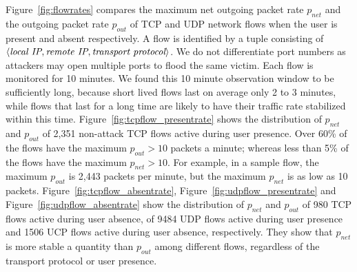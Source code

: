 Figure~\ref{fig:flowrates} compares the maximum net
outgoing packet rate $p_{net}$ and the outgoing packet rate
$p_{out}$ of TCP and UDP network flows when the user is present 
and absent respectively.  A flow is identified by a tuple consisting
of $\langle \mbox{\it local IP}, \mbox{\it remote IP}, 
\mbox{\it transport protocol} \rangle$.
We do not differentiate port numbers as attackers may open
multiple ports to flood the same victim. 
Each flow is monitored for 10 minutes. 
We found this 10 minute observation window to be sufficiently long, because short lived flows last on average only 2 to 3 minutes, 
while flows that last for a long time are likely to
have their traffic rate stabilized within this time.
Figure~\ref{fig:tcpflow_presentrate} shows the distribution of $p_{net}$
and $p_{out}$ of 2,351 non-attack TCP flows active during user presence.
Over 60\% of the flows have the maximum $p_{out}>10$ packets a
minute; whereas less than 5\% of the flows have the maximum
$p_{net}>10$. 
For example, in a sample flow, the maximum $p_{out}$ is 2,443 packets per
minute, but the maximum $p_{net}$ is as low as 10 packets.
Figure~\ref{fig:tcpflow_absentrate}, Figure~\ref{fig:udpflow_presentrate}
and Figure~\ref{fig:udpflow_absentrate} show the distribution of
$p_{net}$ and $p_{out}$ of 980 TCP flows active during user absence,
of 9484 UDP flows active during user presence and 1506 UCP flows
active during user absence, respectively.
They show that $p_{net}$ is more stable a quantity than
$p_{out}$ among different flows,
regardless of the transport protocol or user presence.


